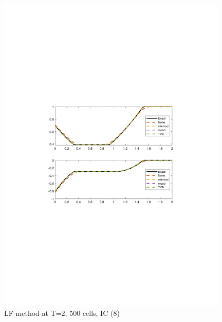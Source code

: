 \documentclass[11pt,a4paper]{article}
\begin{document}
\begin{figure}[!htb]
    \centering
    \includegraphics[width=11cm]{2_3_a_LF.pdf}
    \caption{LF method at T=2, 500 cells, IC (8)}
    \label{fig:FL_IC_4}
\end{figure}
\end{document}
